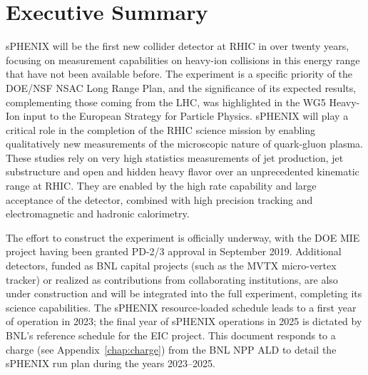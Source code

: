 \chapter*{Executive Summary}
\label{executive_summary}
\setcounter{page}{1}

sPHENIX will be the first new collider detector at RHIC in over twenty
years, focusing on measurement capabilities on heavy-ion collisions in
this energy range that have not been available before.  The experiment
is a specific priority of the DOE/NSF NSAC Long Range Plan, and the
significance of its expected results, complementing those coming from
the LHC, was highlighted in the WG5 Heavy-Ion input to the European
Strategy for Particle Physics.  sPHENIX will play a critical role in
the completion of the RHIC science mission by enabling qualitatively
new measurements of the microscopic nature of quark-gluon plasma.
These studies rely on very high statistics measurements of jet
production, jet substructure and open and hidden heavy flavor over an
unprecedented kinematic range at RHIC.  They are enabled by the high
rate capability and large acceptance of the detector, combined with
high precision tracking and electromagnetic and hadronic calorimetry.

The effort to construct the experiment is officially underway, with
the DOE MIE project having been granted PD-2/3 approval in September
2019.  Additional detectors, funded as BNL capital projects (such as
the MVTX micro-vertex tracker) or realized as contributions from
collaborating institutions, are also under construction and will be
integrated into the full experiment, completing its science
capabilities.  The sPHENIX resource-loaded schedule leads to a first
year of operation in 2023; the final year of sPHENIX operations in
2025 is dictated by BNL's reference schedule for the EIC project.
This document responds to a charge (see Appendix~\ref{chap:charge})
from the BNL NPP ALD to detail the sPHENIX run plan during the years
2023--2025.


